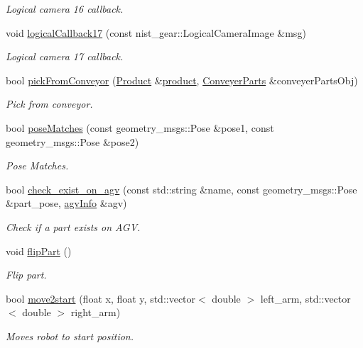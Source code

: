 \begin{DoxyCompactItemize}
\begin{DoxyCompactList}\small\item\em Logical camera 16 callback. \end{DoxyCompactList}\item 
void \hyperlink{classGantryControl_a9d745504ec1dbcc8549f5a604f34bbcc}{logical\+Callback17} (const nist\+\_\+gear\+::\+Logical\+Camera\+Image \&msg)
\begin{DoxyCompactList}\small\item\em Logical camera 17 callback. \end{DoxyCompactList}\item 
bool \hyperlink{classGantryControl_aa12af59b0fda9a1437db989a13036934}{pick\+From\+Conveyor} (\hyperlink{structProduct}{Product} \&\hyperlink{utils_8h_a48a7207852c0455cce7e65703b12ec7e}{product}, \hyperlink{classConveyerParts}{Conveyer\+Parts} \&conveyer\+Parts\+Obj)
\begin{DoxyCompactList}\small\item\em Pick from conveyor. \end{DoxyCompactList}\item 
bool \hyperlink{classGantryControl_a9c655daed586e64921ffc53cb90b2873}{pose\+Matches} (const geometry\+\_\+msgs\+::\+Pose \&pose1, const geometry\+\_\+msgs\+::\+Pose \&pose2)
\begin{DoxyCompactList}\small\item\em Pose Matches. \end{DoxyCompactList}\item 
bool \hyperlink{classGantryControl_a31672ce076ba59662af6c77c82ab136f}{check\+\_\+exist\+\_\+on\+\_\+agv} (const std\+::string \&name, const geometry\+\_\+msgs\+::\+Pose \&part\+\_\+pose, \hyperlink{structagvInfo}{agv\+Info} \&agv)
\begin{DoxyCompactList}\small\item\em Check if a part exists on A\+GV. \end{DoxyCompactList}\item 
void \hyperlink{classGantryControl_a80a0b29105892d6435ef1bb061f35d8f}{flip\+Part} ()
\begin{DoxyCompactList}\small\item\em Flip part. \end{DoxyCompactList}\item 
bool \hyperlink{classGantryControl_a07051f078937b5a1780108c3374f3c7c}{move2start} (float x, float y, std\+::vector$<$ double $>$ left\+\_\+arm, std\+::vector$<$ double $>$ right\+\_\+arm)
\begin{DoxyCompactList}\small\item\em Moves robot to start position. \end{DoxyCompactList}\item 

\end{DoxyCompactItemize}
